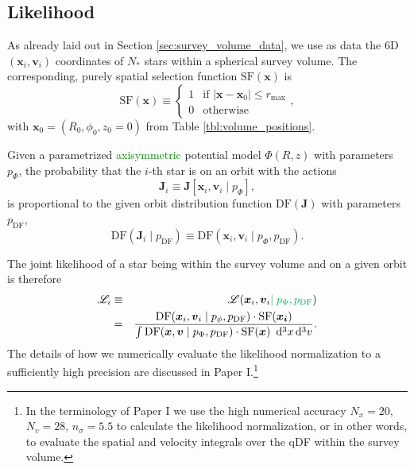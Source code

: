 \documentclass[iop,revtex4,numberedappendix,appendixfloats]{emulateapj}
\newcommand{\vect}[1]{\boldsymbol{#1}}
\newcommand*\Diff[1]{\mathop{}\!\mathrm{d^#1}}
\newcommand{\NEW}[1]{\textcolor{Green}{#1}}
\newcommand{\OLD}[1]{}
\begin{document}
\subsection{Likelihood} \label{sec:likelihood}

As already laid out in Section \ref{sec:survey_volume_data}, we use as data the 6D $(\vect{x}_i,\vect{v}_i)$ coordinates of $N_*$ stars within a spherical survey volume. The corresponding, purely spatial selection function $\text{SF}(\vect{x})$ is
\begin{equation}
\text{SF}(\vect{x}) \equiv \begin{cases} 1 &\mbox{if } \left| \vect{x}-\vect{x}_0 \right| \leq r_\text{max} \\
0 & \mbox{otherwise} \end{cases}, \label{eq:selection_function}
\end{equation}
with $\vect{x}_0 = (R_0,\phi_0,z_0=0)$ from Table \ref{tbl:volume_positions}.

Given a parametrized \NEW{axisymmetric} potential model $\Phi(R,z)$ with parameters $p_\Phi$, the probability that the $i$-th star is on an orbit with the actions 
\begin{equation}
\vect{J}_i \equiv \vect{J}[\vect{x}_i,\vect{v}_i \mid p_\Phi],
\end{equation}
is proportional to the given orbit distribution function $\text{DF}(\vect{J})$ with parameters $p_\text{DF}$,
\begin{equation}
\text{DF}(\vect{J}_i \mid p_\text{DF}) \equiv \text{DF}(\vect{x}_i,\vect{v}_i \mid p_\Phi,p_\text{DF}).
\end{equation}

The joint likelihood of a star being within the survey volume and on a given orbit is therefore
\begin{eqnarray}
\mathscr{L}_i &\equiv& \mathscr{L}(\vect{x}_i,\vect{v}_i\NEW{\mid p_\Phi,p_\text{DF}}) \nonumber\\
&=& \frac{\text{DF}(\vect{x}_i,\vect{v}_i\mid p_\phi, p_\text{DF}) \cdot \text{SF}(\vect{x_i})}{\int \text{DF}(\vect{x},\vect{v}\mid p_\Phi, p_\text{DF}) \cdot \text{SF}(\vect{x}) \ \Diff3 x \Diff3 v}.
\end{eqnarray}
The details of how we numerically evaluate the likelihood normalization to a sufficiently high precision are discussed in Paper I.\footnote{In the terminology of Paper I we use the high numerical accuracy $N_x = 20$, $N_v = 28$, $n_\sigma = 5.5$ to calculate the likelihood normalization, or in other words, to evaluate the spatial and velocity integrals over the qDF within the survey volume. \OLD{For the action interpolation grid following \citet{2015ApJS..216...29B}, we use $R_\text{max}=40~\text{kpc}$, $n_E=70$, $n_\psi=40$, $n_{L_z}=50$ in their terminology.}}
\end{document}
